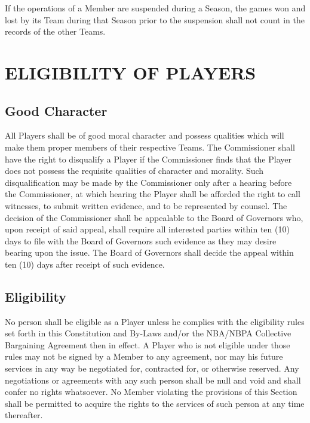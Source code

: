 \documentclass[]{book}
\theoremstyle{definition}
\theoremstyle{definition}
\theoremstyle{definition}
\theoremstyle{remark}
\begin{document}
If the operations of a Member are suspended during a Season, the games
won and lost by its Team during that Season prior to the suspension
shall not count in the records of the other Teams.

\section{ELIGIBILITY OF PLAYERS}\label{eligibility-of-players}

\subsection{Good Character}\label{good-character}

All Players shall be of good moral character and possess qualities which
will make them proper members of their respective Teams. The
Commissioner shall have the right to disqualify a Player if the
Commissioner finds that the Player does not possess the requisite
qualities of character and morality. Such disqualification may be made
by the Commissioner only after a hearing before the Commissioner, at
which hearing the Player shall be afforded the right to call witnesses,
to submit written evidence, and to be represented by counsel. The
decision of the Commissioner shall be appealable to the Board of
Governors who, upon receipt of said appeal, shall require all interested
parties within ten (10) days to file with the Board of Governors such
evidence as they may desire bearing upon the issue. The Board of
Governors shall decide the appeal within ten (10) days after receipt of
such evidence.

\subsection{Eligibility}\label{eligibility}

No person shall be eligible as a Player unless he complies with the
eligibility rules set forth in this Constitution and By-Laws and/or the
NBA/NBPA Collective Bargaining Agreement then in effect. A Player who is
not eligible under those rules may not be signed by a Member to any
agreement, nor may his future services in any way be negotiated for,
contracted for, or otherwise reserved. Any negotiations or agreements
with any such person shall be null and void and shall confer no rights
whatsoever. No Member violating the provisions of this Section shall be
permitted to acquire the rights to the services of such person at any
time thereafter.
\end{document}
